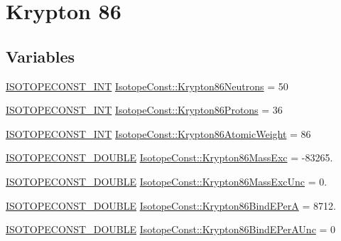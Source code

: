 \hypertarget{group___isotope_const-_krypton-_kr86}{}\section{Krypton 86}
\label{group___isotope_const-_krypton-_kr86}
\subsection*{Variables}
\begin{DoxyCompactItemize}
\item 
\mbox{\hyperlink{group___isotope_const-_macros_ga5f18360b3e99483a35c32d789e62621c}{I\+S\+O\+T\+O\+P\+E\+C\+O\+N\+S\+T\+\_\+\+I\+NT}} \mbox{\hyperlink{group___isotope_const-_krypton-_kr86_ga2fcc24f8d59d3bc91dc3fd57daa8dc32}{Isotope\+Const\+::\+Krypton86\+Neutrons}} = 50
\item 
\mbox{\hyperlink{group___isotope_const-_macros_ga5f18360b3e99483a35c32d789e62621c}{I\+S\+O\+T\+O\+P\+E\+C\+O\+N\+S\+T\+\_\+\+I\+NT}} \mbox{\hyperlink{group___isotope_const-_krypton-_kr86_ga45004b85262605c325bcc11d3831f95b}{Isotope\+Const\+::\+Krypton86\+Protons}} = 36
\item 
\mbox{\hyperlink{group___isotope_const-_macros_ga5f18360b3e99483a35c32d789e62621c}{I\+S\+O\+T\+O\+P\+E\+C\+O\+N\+S\+T\+\_\+\+I\+NT}} \mbox{\hyperlink{group___isotope_const-_krypton-_kr86_ga2bb5429e9259131919270f071cf338f3}{Isotope\+Const\+::\+Krypton86\+Atomic\+Weight}} = 86
\item 
\mbox{\hyperlink{group___isotope_const-_macros_ga8f45a7272ce02c0b4c65c44636ed719a}{I\+S\+O\+T\+O\+P\+E\+C\+O\+N\+S\+T\+\_\+\+D\+O\+U\+B\+LE}} \mbox{\hyperlink{group___isotope_const-_krypton-_kr86_ga2432686ef01aa05410b2e8249952d22f}{Isotope\+Const\+::\+Krypton86\+Mass\+Exc}} = -\/83265.
\item 
\mbox{\hyperlink{group___isotope_const-_macros_ga8f45a7272ce02c0b4c65c44636ed719a}{I\+S\+O\+T\+O\+P\+E\+C\+O\+N\+S\+T\+\_\+\+D\+O\+U\+B\+LE}} \mbox{\hyperlink{group___isotope_const-_krypton-_kr86_ga62b5541b22a2801b110625702c606f5a}{Isotope\+Const\+::\+Krypton86\+Mass\+Exc\+Unc}} = 0.
\item 
\mbox{\hyperlink{group___isotope_const-_macros_ga8f45a7272ce02c0b4c65c44636ed719a}{I\+S\+O\+T\+O\+P\+E\+C\+O\+N\+S\+T\+\_\+\+D\+O\+U\+B\+LE}} \mbox{\hyperlink{group___isotope_const-_krypton-_kr86_gad49287a4eea47039de9bbcaa9f5d8e4c}{Isotope\+Const\+::\+Krypton86\+Bind\+E\+PerA}} = 8712.
\item 
\mbox{\hyperlink{group___isotope_const-_macros_ga8f45a7272ce02c0b4c65c44636ed719a}{I\+S\+O\+T\+O\+P\+E\+C\+O\+N\+S\+T\+\_\+\+D\+O\+U\+B\+LE}} \mbox{\hyperlink{group___isotope_const-_krypton-_kr86_ga1e4a7e1f9710f1db77221f603019b8c3}{Isotope\+Const\+::\+Krypton86\+Bind\+E\+Per\+A\+Unc}} = 0

\end{DoxyCompactItemize}
